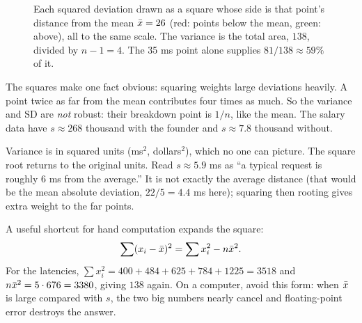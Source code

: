 \begin{figure}[H]
\centering
{}
\caption{Each squared deviation drawn as a square whose side is that point's distance
from the mean $\bar{x}=26$ (red: points below the mean, green: above), all to the same
scale. The variance is the total area, $138$, divided by $n-1=4$. The 35 ms point
alone supplies $81/138 \approx 59\%$ of it.}
\label{fig:center-spread-squares}
\end{figure}

The squares make one fact obvious: squaring weights large deviations heavily. A
point twice as far from the mean contributes four times as much. So the variance
and SD are \emph{not} robust: their breakdown point is $1/n$, like the mean. The
salary data have $s \approx 268$ thousand with the founder and $s \approx 7.8$
thousand without.

\begin{intuitionbox}
Variance is in squared units (ms$^2$, dollars$^2$), which no one can picture. The
square root returns to the original units. Read $s \approx 5.9$ ms as ``a typical
request is roughly 6 ms from the average.'' It is not exactly the average distance
(that would be the mean absolute deviation, $22/5 = 4.4$ ms here); squaring then
rooting gives extra weight to the far points.
\end{intuitionbox}

A useful shortcut for hand computation expands the square:
\[
  \sum (x_i - \bar{x})^2 = \sum x_i^2 - n\bar{x}^2 .
\]
For the latencies, $\sum x_i^2 = 400+484+625+784+1225 = 3518$ and
$n\bar{x}^2 = 5\cdot 676 = 3380$, giving $138$ again. On a computer, avoid this
form: when $\bar{x}$ is large compared with $s$, the two big numbers nearly cancel and
floating-point error destroys the answer.

